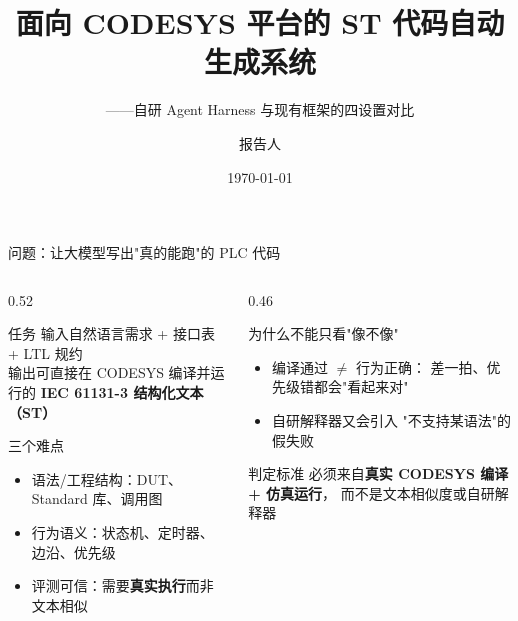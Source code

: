 \documentclass[10pt,aspectratio=169]{beamer}
\title[CODESYS ST 代码自动生成]{面向 CODESYS 平台的 ST 代码自动生成系统}
\subtitle{——自研 Agent Harness 与现有框架的四设置对比}
\author[报告人]{报告人}
\institute[ZJU]{计算机学院 \\ 浙江大学}
\date{\today}
\begin{document}
\begin{frame}
	\titlepage
\end{frame}

\begin{frame}{问题：让大模型写出"真的能跑"的 PLC 代码}
	\begin{columns}[T]
		\begin{column}{0.52\textwidth}
			\begin{block}{任务}
				输入自然语言需求 + 接口表 + LTL 规约 \\
				输出可直接在 CODESYS 编译并运行的
				\textbf{IEC 61131-3 结构化文本（ST）}
			\end{block}
			\begin{alertblock}{三个难点}
				\begin{itemize}
					\item 语法/工程结构：DUT、Standard 库、调用图
					\item 行为语义：状态机、定时器、边沿、优先级
					\item 评测可信：需要\textbf{真实执行}而非文本相似
				\end{itemize}
			\end{alertblock}
		\end{column}
		\begin{column}{0.46\textwidth}
			\begin{block}{为什么不能只看"像不像"}
				\begin{itemize}
					\item 编译通过 $\neq$ 行为正确：
					      差一拍、优先级错都会"看起来对"
					\item 自研解释器又会引入
					      "不支持某语法"的假失败
				\end{itemize}
			\end{block}
			\begin{exampleblock}{判定标准}
				必须来自\textbf{真实 CODESYS 编译 + 仿真运行}，
				而不是文本相似度或自研解释器
			\end{exampleblock}
		\end{column}
	\end{columns}
\end{frame}
\end{document}
